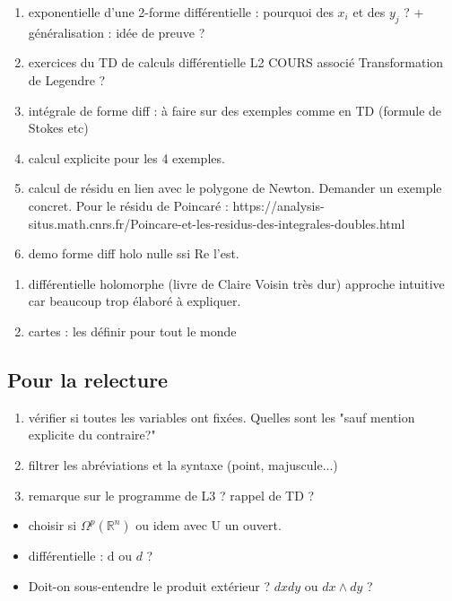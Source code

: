 \documentclass{article}
\newcommand{\R}{\mathbb{R}} %
\theoremstyle{definition} %
\newcommand{\OM}[1]{\Omega^{#1} (\R^n)}
\newcommand{\dd}{ \mathrm{d}}
\newcommand{\1}{\mathbb{1}} %
\begin{document}
\begin{enumerate}

\item exponentielle d'une 2-forme différentielle : pourquoi des $x_i$ et des $y_j$ ?
+ généralisation : idée de preuve ?

\item exercices du TD de calculs différentielle L2  COURS associé
Transformation de Legendre ?

\item intégrale de forme diff : à faire sur des exemples comme en TD (formule de Stokes etc)

\item calcul explicite pour les 4 exemples.

\item calcul de résidu en lien avec le polygone de Newton.
Demander un exemple concret. Pour le résidu de Poincaré : https://analysis-situs.math.cnrs.fr/Poincare-et-les-residus-des-integrales-doubles.html

\item demo forme diff holo nulle ssi Re l'est.

\end{enumerate}

\begin{enumerate}


\item différentielle holomorphe (livre de Claire Voisin très dur)
approche intuitive car beaucoup trop élaboré à expliquer.

\item cartes : les définir pour tout le monde

\end{enumerate}

\subsection{Pour la relecture}

\begin{enumerate}
    \item vérifier si toutes les variables ont fixées. Quelles sont les "sauf mention explicite du contraire?"
    \item filtrer les abréviations et la syntaxe (point, majuscule...)
    \item remarque sur le programme de L3 ? rappel de TD ?
\end{enumerate}

\begin{itemize}
\item choisir si $\OM{p}$ ou idem avec U un ouvert.
\item différentielle : $\dd$ ou $d$ ?
\item Doit-on sous-entendre le produit extérieur ? $dxdy$ ou $dx \wedge dy$ ?
\end{itemize}
\end{document}
